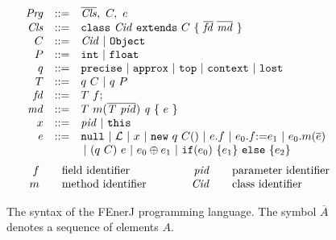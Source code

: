 \begin{figure}
\small
\[
\begin{array}{l}
\begin{array}{r@{\quad ::= \quad }l}
\mathit{Prg}      &  \overline{\mathit{Cls}},\ C,\ e \\

\mathit{Cls}      &  \mathtt{class}\ \mathit{Cid}\ \mathtt{extends}\ C\
\{\ \mathit{\overline{fd}\ \overline{md}}\ \} \\

C        &  \mathit{Cid}\ |\ \mathtt{Object} \\

P        &  \mathtt{int}\ |\ \mathtt{float} \\

q        &  \mathtt{precise}\ |\ \mathtt{approx}\ |\ \mathtt{top}
            \ |\ \mathtt{context}\ |\ \mathtt{lost}\\

T        &  q\ C \ |\ q\ P\\

\mathit{fd}   &  T\ f\mathtt{;} \\

\mathit{md}   &  T\ m(\overline{\mathit{T\ pid}})\ \mathit{q}\ \{\ e\ \} \\

x        &  \mathit{pid}\ |\ \mathtt{this} \\

e        &  \mathtt{null}\ |\ \lit\ |\ x\ |\ \mathtt{new}\ q\ C()\ |\
                e.f\ |\ e_0.f \mathtt{:=} e_1\ | \
                e_0.m(\overline{e})\\
\multicolumn{2}{l}{\hspace{1.8cm} |\
                (q\ C)\ e \ | \
                e_0 \oplus e_1 \ | \
         \mathtt{if(} e_0 \mathtt{)\ \{} e_1 \mathtt{\}\ else\ \{} e_2 \mathtt{\}}}\\

\end{array}
\\
\vspace{-2mm}
\\

\
\begin{array}{r@{\qquad}l@{\qquad\qquad}r@{\qquad}l}
f        &  \mbox{field identifier} &
\mathit{pid}      &  \mbox{parameter identifier}\\
m        &  \mbox{method identifier} &
\mathit{Cid}      &  \mbox{class identifier}\\
\end{array}
\end{array}
\]

\caption{The syntax of the FEnerJ programming language.
The symbol $\overline{A}$ denotes a sequence of elements $A$.
\label{fig:syntax}
}
\end{figure}

